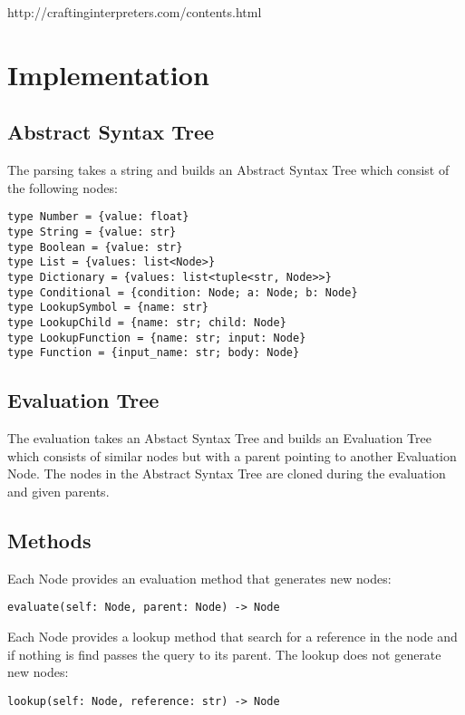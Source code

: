 \documentclass[a4paper,12pt]{article}
\begin{document}
http://craftinginterpreters.com/contents.html

\section{Implementation}

\subsection{Abstract Syntax Tree}
The parsing takes a string and builds an Abstract Syntax Tree which consist of the following nodes:
\begin{verbatim}
type Number = {value: float}
type String = {value: str}
type Boolean = {value: str}
type List = {values: list<Node>}
type Dictionary = {values: list<tuple<str, Node>>}
type Conditional = {condition: Node; a: Node; b: Node}
type LookupSymbol = {name: str}
type LookupChild = {name: str; child: Node}
type LookupFunction = {name: str; input: Node}
type Function = {input_name: str; body: Node}
\end{verbatim}

\subsection{Evaluation Tree}

The evaluation takes an Abstact Syntax Tree and builds an Evaluation Tree which consists of similar nodes but with a parent pointing to another Evaluation Node. The nodes in the Abstract Syntax Tree are cloned during the evaluation and given parents.

\subsection{Methods}

Each Node provides an evaluation method that generates new nodes:
\begin{verbatim}
evaluate(self: Node, parent: Node) -> Node
\end{verbatim}
Each Node provides a lookup method that search for a reference in the node and if nothing is find passes the query to its parent. The lookup does not generate new nodes:
\begin{verbatim}
lookup(self: Node, reference: str) -> Node
\end{verbatim}
\end{document}
